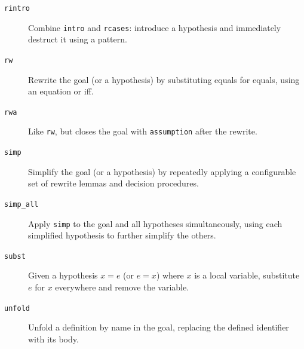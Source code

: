 \documentclass{amsart}
\begin{document}
\begin{description}
  \item[\texttt{rintro}]
    Combine \texttt{intro} and \texttt{rcases}: introduce a hypothesis and
    immediately destruct it using a pattern.

  \item[\texttt{rw}]
    Rewrite the goal (or a hypothesis) by substituting equals for equals,
    using an equation or iff.

  \item[\texttt{rwa}]
    Like \texttt{rw}, but closes the goal with \texttt{assumption} after
    the rewrite.

  \item[\texttt{simp}]
    Simplify the goal (or a hypothesis) by repeatedly applying a
    configurable set of rewrite lemmas and decision procedures.

  \item[\texttt{simp\_all}]
    Apply \texttt{simp} to the goal and all hypotheses simultaneously,
    using each simplified hypothesis to further simplify the others.

  \item[\texttt{subst}]
    Given a hypothesis $x = e$ (or $e = x$) where $x$ is a local
    variable, substitute $e$ for $x$ everywhere and remove the variable.

  \item[\texttt{unfold}]
    Unfold a definition by name in the goal, replacing the defined
    identifier with its body.
\end{description}
\end{document}
